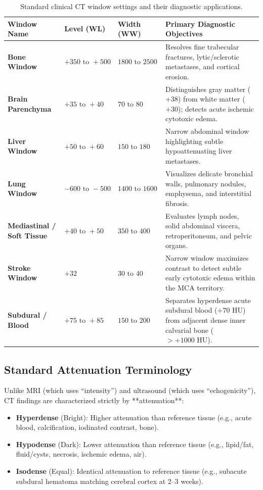 \documentclass[11pt,a4paper]{article}
\begin{document}
\begin{table}[htbp]
\centering
\small
\renewcommand{\arraystretch}{1.2}
\begin{tabular}{p{3.5cm}p{2cm}p{2cm}p{7.5cm}}
\toprule
\textbf{Window Name} & \textbf{Level (WL)} & \textbf{Width (WW)} & \textbf{Primary Diagnostic Objectives} \\
\midrule
\textbf{Bone Window} & $+350\text{ to } +500$ & $1800\text{ to } 2500$ & Resolves fine trabecular fractures, lytic/sclerotic metastases, and cortical erosion. \\
\textbf{Brain Parenchyma} & $+35\text{ to } +40$ & $70\text{ to } 80$ & Distinguishes gray matter ($+38$) from white matter ($+30$); detects acute ischemic cytotoxic edema. \\
\textbf{Liver Window} & $+50\text{ to } +60$ & $150\text{ to } 180$ & Narrow abdominal window highlighting subtle hypoattenuating liver metastases. \\
\textbf{Lung Window} & $-600\text{ to } -500$ & $1400\text{ to } 1600$ & Visualizes delicate bronchial walls, pulmonary nodules, emphysema, and interstitial fibrosis. \\
\textbf{Mediastinal / Soft Tissue} & $+40\text{ to } +50$ & $350\text{ to } 400$ & Evaluates lymph nodes, solid abdominal viscera, retroperitoneum, and pelvic organs. \\
\textbf{Stroke Window} & $+32$ & $30\text{ to } 40$ & Narrow window maximizes contrast to detect subtle early cytotoxic edema within the MCA territory. \\
\textbf{Subdural / Blood} & $+75\text{ to } +85$ & $150\text{ to } 200$ & Separates hyperdense acute subdural blood ($+70\text{ HU}$) from adjacent dense inner calvarial bone ($>+1000\text{ HU}$). \\
\bottomrule
\end{tabular}
\caption{Standard clinical CT window settings and their diagnostic applications.}
\label{tab:ct_windows}
\end{table}

\subsection{Standard Attenuation Terminology}
Unlike MRI (which uses ``intensity'') and ultrasound (which uses ``echogenicity''), CT findings are characterized strictly by **attenuation**:
\begin{itemize}
    \item \textbf{Hyperdense} (Bright): Higher attenuation than reference tissue (e.g., acute blood, calcification, iodinated contrast, bone).
    \item \textbf{Hypodense} (Dark): Lower attenuation than reference tissue (e.g., lipid/fat, fluid/cysts, necrosis, ischemic edema, air).
    \item \textbf{Isodense} (Equal): Identical attenuation to reference tissue (e.g., subacute subdural hematoma matching cerebral cortex at 2--3 weeks).
\end{itemize}
\end{document}
